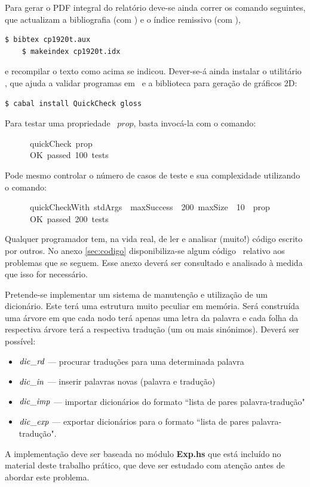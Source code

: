 \documentclass[a4paper]{article}
\newcommand{\Varid}[1]{\mathit{#1}}
\begin{document}
Para gerar o PDF integral do relatório deve-se ainda correr os comando seguintes,
que actualizam a bibliografia (com \Bibtex) e o índice remissivo (com \Makeindex),
\begin{Verbatim}[fontsize=\small]
    $ bibtex cp1920t.aux
    $ makeindex cp1920t.idx
\end{Verbatim}
e recompilar o texto como acima se indicou. Dever-se-á ainda instalar o utilitário
\QuickCheck,
que ajuda a validar programas em \Haskell\ e a biblioteca  para
geração de gráficos 2D:
\begin{Verbatim}[fontsize=\small]
    $ cabal install QuickCheck gloss
\end{Verbatim}
Para testar uma propriedade \QuickCheck~\ensuremath{\Varid{prop}}, basta invocá-la com o comando:
\begin{tabbing}\ttfamily
~~~~~~quickCheck~prop\\
\ttfamily ~~~~~~OK~passed~100~tests
\end{tabbing}
Pode mesmo controlar o número de casos de teste e sua complexidade utilizando
o comando:
\begin{tabbing}\ttfamily
~~~~~~quickCheckWith~stdArgs~~maxSuccess~~200~maxSize~~10~~prop\\
\ttfamily ~~~~~~OK~passed~200~tests
\end{tabbing}
Qualquer programador tem, na vida real, de ler e analisar (muito!) código
escrito por outros. No anexo \ref{sec:codigo} disponibiliza-se algum
código \Haskell\ relativo aos problemas que se seguem. Esse anexo deverá
ser consultado e analisado à medida que isso for necessário.

\Problema

Pretende-se implementar um sistema de manutenção e utilização de um dicionário.
Este terá uma estrutura muito peculiar em memória. Será construída
uma árvore em que cada nodo terá apenas uma letra da palavra e cada
folha da respectiva árvore terá a respectiva tradução (um ou mais sinónimos).
Deverá ser possível:
\begin{itemize}
\item
\ensuremath{\Varid{dic\char95 rd}} --- procurar traduções para uma determinada palavra
\item   
\ensuremath{\Varid{dic\char95 in}} --- inserir palavras novas (palavra e tradução)
\item
\ensuremath{\Varid{dic\char95 imp}} --- importar dicionários do formato ``lista de pares palavra-tradução"
\item
\ensuremath{\Varid{dic\char95 exp}} --- exportar dicionários para o formato ``lista de pares palavra-tradução".
\end{itemize}
A implementação deve ser baseada no módulo \textbf{Exp.hs} que está incluído no material deste trabalho prático,
que deve ser estudado com atenção antes de abordar este problema.
\end{document}
